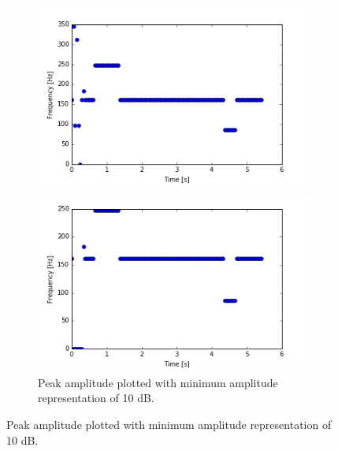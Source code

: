 \begin{figure}[H]
\centering
\begin{subfigure}{0.49\textwidth}
\centering
\includegraphics[width=\textwidth]{figures/peak_detection/peak_lim1.png}
\caption{Peak amplitude plotted with minimum amplitude representation of -3 dB.}
\label{fig:freq_-3dB_Amp_pass}

\includegraphics[width=\textwidth]{figures/peak_detection/peak_lim2.png}
\caption{Peak amplitude plotted with minimum amplitude representation of 10 dB.}
\label{fig:freq_10dB_Amp_pass}


\end{subfigure}
\end{figure}

